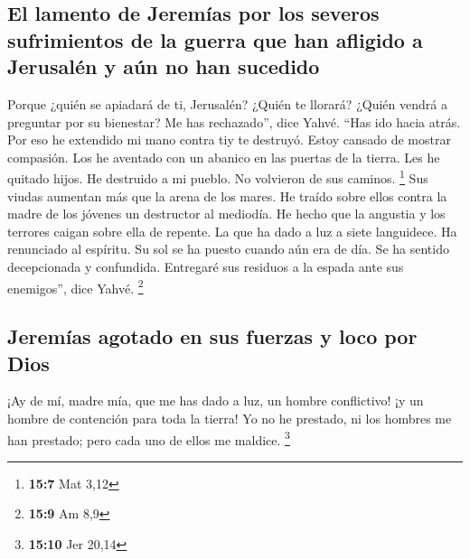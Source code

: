 \hypertarget{el-lamento-de-jeremuxedas-por-los-severos-sufrimientos-de-la-guerra-que-han-afligido-a-jerusaluxe9n-y-auxfan-no-han-sucedido}{%
\subsection{El lamento de Jeremías por los severos sufrimientos de la
guerra que han afligido a Jerusalén y aún no han
sucedido}\label{el-lamento-de-jeremuxedas-por-los-severos-sufrimientos-de-la-guerra-que-han-afligido-a-jerusaluxe9n-y-auxfan-no-han-sucedido}}

 Porque ¿quién se apiadará de ti, Jerusalén? ¿Quién te
llorará? ¿Quién vendrá a preguntar por su bienestar?  Me
has rechazado'', dice Yahvé. ``Has ido hacia atrás. Por eso he extendido
mi mano contra tiy te destruyó. Estoy cansado de mostrar compasión.
 Los he aventado con un abanico en las puertas de la
tierra. Les he quitado hijos. He destruido a mi pueblo. No volvieron de
sus caminos. \footnote{\textbf{15:7} Mat 3,12}  Sus viudas
aumentan más que la arena de los mares. He traído sobre ellos contra la
madre de los jóvenes un destructor al mediodía. He hecho que la angustia
y los terrores caigan sobre ella de repente.  La que ha
dado a luz a siete languidece. Ha renunciado al espíritu. Su sol se ha
puesto cuando aún era de día. Se ha sentido decepcionada y confundida.
Entregaré sus residuos a la espada ante sus enemigos'', dice Yahvé.
\footnote{\textbf{15:9} Am 8,9}

\hypertarget{jeremuxedas-agotado-en-sus-fuerzas-y-loco-por-dios}{%
\subsection{Jeremías agotado en sus fuerzas y loco por
Dios}\label{jeremuxedas-agotado-en-sus-fuerzas-y-loco-por-dios}}

 ¡Ay de mí, madre mía, que me has dado a luz, un hombre
conflictivo! ¡y un hombre de contención para toda la tierra! Yo no he
prestado, ni los hombres me han prestado; pero cada uno de ellos me
maldice. \footnote{\textbf{15:10} Jer 20,14}

